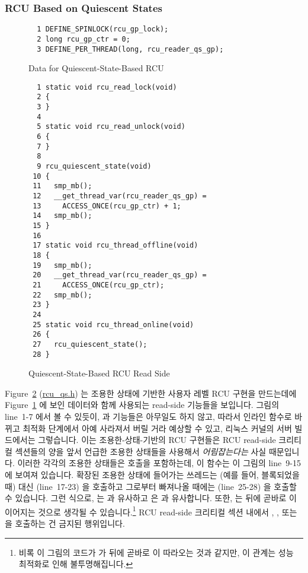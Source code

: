 \subsubsection{RCU Based on Quiescent States}
\label{defer:RCU Based on Quiescent States}

\begin{figure}[tbp]
{ \scriptsize
\begin{verbatim}
  1 DEFINE_SPINLOCK(rcu_gp_lock);
  2 long rcu_gp_ctr = 0;
  3 DEFINE_PER_THREAD(long, rcu_reader_qs_gp);
\end{verbatim}
}
\caption{Data for Quiescent-State-Based RCU}
\label{fig:defer:Data for Quiescent-State-Based RCU}
\end{figure}

\begin{figure}[tbp]
{ \scriptsize
\begin{verbatim}
  1 static void rcu_read_lock(void)
  2 {
  3 }
  4
  5 static void rcu_read_unlock(void)
  6 {
  7 }
  8
  9 rcu_quiescent_state(void)
 10 {
 11   smp_mb();
 12   __get_thread_var(rcu_reader_qs_gp) =
 13     ACCESS_ONCE(rcu_gp_ctr) + 1;
 14   smp_mb();
 15 }
 16
 17 static void rcu_thread_offline(void)
 18 {
 19   smp_mb();
 20   __get_thread_var(rcu_reader_qs_gp) =
 21     ACCESS_ONCE(rcu_gp_ctr);
 22   smp_mb();
 23 }
 24
 25 static void rcu_thread_online(void)
 26 {
 27   rcu_quiescent_state();
 28 }
\end{verbatim}
}
\caption{Quiescent-State-Based RCU Read Side}
\label{fig:defer:Quiescent-State-Based RCU Read Side}
\end{figure}

Figure~\ref{fig:defer:Quiescent-State-Based RCU Read Side}
(\url{rcu_qs.h})
는 조용한 상태에 기반한 사용자 레벨 RCU 구현을 만드는데에
Figure~\ref{fig:defer:Data for Quiescent-State-Based RCU} 에 보인 데이터와 함께
사용되는 read-side 기능들을 보입니다.
그림의 line~1-7 에서 볼 수 있듯이,  과
 기능들은 아무일도 하지 않고, 따라서 인라인 함수로 바뀌고
최적화 단계에서 아예 사라져서 버릴 거라 예상할 수 있고, 리눅스 커널의 서버
빌드에서는 그렇습니다.
이는 조용한-상태-기반의 RCU 구현들은 RCU read-side 크리티컬 섹션들의 양을 앞서
언급한 조용한 상태들을 사용해서 \emph{어림잡는다는} 사실 때문입니다.
이러한 각각의 조용한 상태들은  호출을 포함하는데, 이
함수는 이 그림의 line~9-15 에 보여져 있습니다.
확장된 조용한 상태에 들어가는 쓰레드는 (예를 들어, 블록되었을 때) 대신
 (line~17-23) 을 호출하고 그로부터 빠져나올 때에는
 (line~25-28) 을 호출할 수 있습니다.
그런 식으로,  는  과 유사하고
 은  과 유사합니다.
또한,  는  뒤에 곧바로
 이 이어지는 것으로 생각될 수 있습니다.\footnote{
	비록 이 그림의 코드가  가
	 뒤에 곧바로  이
	따라오는 것과 같지만, 이 관계는 성능 최적화로 인해 불투명해집니다.}
RCU read-side 크리티컬 섹션 내에서 ,
, 또는  을 호출하는 건 금지된
행위입니다.
\iffalse

